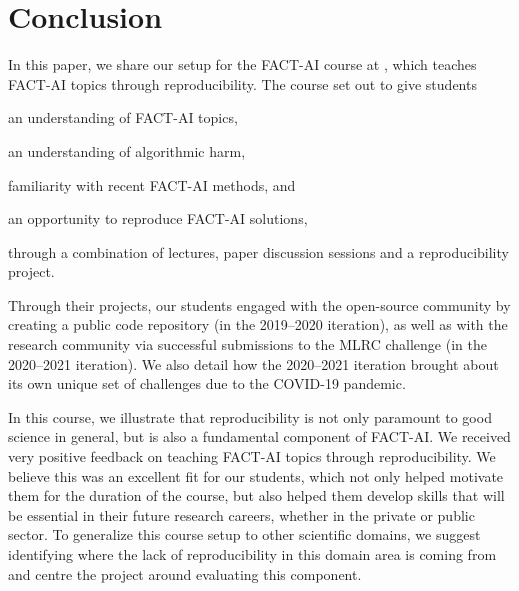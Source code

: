 
\section{Conclusion}
\label{section:conclusion}

In this paper, we share our setup for the FACT-AI course at \OurUniversity{}, which teaches FACT-AI topics through reproducibility. 
The course set out to give students 
\begin{enumerate*}[label=(\roman*)]
    \item an understanding of FACT-AI topics, 
    \item an understanding of algorithmic harm, 
    \item familiarity with recent FACT-AI methods, and
    \item an opportunity to reproduce FACT-AI solutions, 
\end{enumerate*}
through a combination of lectures, paper discussion sessions and a reproducibility project. 

Through their projects, our students engaged with the open-source community by creating a public code repository (in the 2019--2020 iteration), as well as with the research community via successful submissions to the MLRC challenge (in the 2020--2021 iteration). 
We also detail how the 2020--2021 iteration brought about its own unique set of challenges due to the COVID-19 pandemic. 

In this course, we illustrate that reproducibility is not only paramount to good science in general, but is also a fundamental component of FACT-AI. 
We received very positive feedback on teaching FACT-AI topics through reproducibility. We believe this was an excellent fit for our students, which not only helped motivate them for the duration of the course, but also helped them develop skills that will be essential in their future research careers, whether in the private or public sector. 
%
%
%
To generalize this course setup to other scientific domains, we suggest identifying where the lack of reproducibility in this domain area is coming from and centre the project around evaluating this component. 
